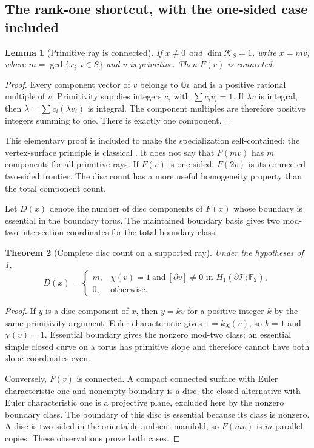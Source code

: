 \documentclass[11pt,a4paper]{article}
\newtheorem{theorem}{Theorem}[section]
\newtheorem{lemma}[theorem]{Lemma}
\theoremstyle{definition}
\newcommand{\Q}{\mathbb Q}
\newcommand{\F}{\mathbb F}
\newcommand{\calK}{\mathcal K}
\newcommand{\calT}{\mathcal T}
\begin{document}
\subsection{The rank-one shortcut, with the one-sided case included}

\begin{lemma}[Primitive ray is connected]
\label{lem:primitive}
If $x\ne0$ and $\dim\calK_S=1$, write $x=mv$, where
$m=\gcd\{x_i:i\in S\}$ and $v$ is primitive.  Then $F(v)$ is connected.
\end{lemma}

\begin{proof}
Every component vector of $v$ belongs to $\Q v$ and is a positive rational
multiple of $v$.  Primitivity supplies integers $c_i$ with $\sum c_i v_i=1$.
If $\lambda v$ is integral, then $\lambda=\sum c_i(\lambda v_i)$ is integral.
The component multiples are therefore positive integers summing to one.
There is exactly one component.
\end{proof}

This elementary proof is included to make the specialization self-contained;
the vertex-surface principle is classical \cite{HLP99}.  It does not say that
$F(mv)$ has $m$ components for all primitive rays.  If $F(v)$ is one-sided,
$F(2v)$ is its connected two-sided frontier.  The disc count has a more useful
homogeneity property than the total component count.

Let $D(x)$ denote the number of disc components of $F(x)$ whose boundary is
essential in the boundary torus.  The maintained boundary basis gives two
mod-two intersection coordinates for the total boundary class.

\begin{theorem}[Complete disc count on a supported ray]
\label{thm:raydisc}
Under the hypotheses of \cref{lem:primitive},
\begin{equation}
 D(x)=
 \begin{cases}
 m,&\chi(v)=1\ \text{and}\ [\partial v]\ne0
       \text{ in }H_1(\partial\calT;\F_2),\\
 0,&\text{otherwise}.
 \end{cases}                                  \label{eq:raydisc}
\end{equation}
\end{theorem}

\begin{proof}
If $y$ is a disc component of $x$, then $y=kv$ for a positive integer $k$ by
the same primitivity argument.  Euler characteristic gives $1=k\chi(v)$,
so $k=1$ and $\chi(v)=1$.  Essential boundary gives the nonzero mod-two class:
an essential simple closed curve on a torus has primitive slope and therefore
cannot have both slope coordinates even.

Conversely, $F(v)$ is connected.  A compact connected surface with Euler
characteristic one and nonempty boundary is a disc; the closed alternative
with Euler characteristic one is a projective plane, excluded here by the
nonzero boundary class.  The boundary of this disc is essential because its
class is nonzero.  A disc is two-sided in the orientable ambient manifold,
so $F(mv)$ is $m$ parallel copies.  These observations prove both cases.
\end{proof}
\end{document}
